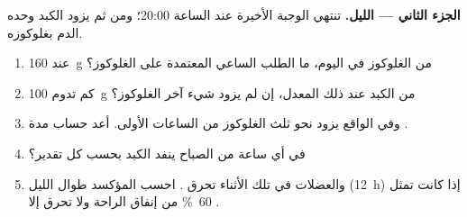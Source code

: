 \begin{problem}
\medskip
\noindent\textbf{الجزء الثاني --- الليل.}
تنتهي الوجبة الأخيرة عند الساعة 20:00؛ ومن ثم يزود الكبد وحده الدم
بغلوكوزه.
\begin{enumerate}[resume]
  \item عند \qty{160}{g} من الغلوكوز في اليوم، ما الطلب الساعي
         المعتمدة على الغلوكوز؟
  \item كم تدوم \qty{100}{g} من  الكبد عند ذلك المعدل، إن لم
        يزود شيء آخر الغلوكوز؟
  \item وفي الواقع يزود  نحو ثلث الغلوكوز من الساعات
        الأولى. أعد حساب مدة .
  \item في أي ساعة من الصباح ينفد  الكبد بحسب كل تقدير؟
  \item والعضلات في تلك الأثناء تحرق . احسب 
        المؤكسد طوال الليل (\qty{12}{h}) إذا كانت تمثل \qty{60}{\%}
        من إنفاق الراحة ولا تحرق إلا .
\end{enumerate}


\end{problem}
